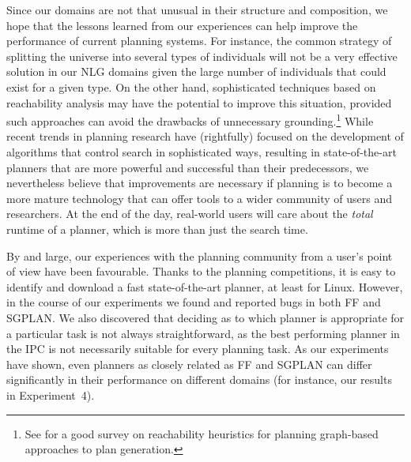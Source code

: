 Since our domains are not that unusual in their structure and composition,
we hope that the lessons learned from our experiences can help improve the
performance of current planning systems. For instance, the common strategy
of splitting the universe into several types of individuals will not be a
very effective solution in our NLG domains given the large number of
individuals that could exist for a given type. On the other hand,
sophisticated techniques based on reachability analysis may have the
potential to improve this situation, provided such approaches can avoid the
drawbacks of unnecessary grounding.\footnote{See
  \citep{Bryce:07} for a good survey on reachability heuristics for planning
  graph-based approaches to plan generation.}
While recent trends in planning research have (rightfully) focused on the
development of algorithms that control search in sophisticated ways,
resulting in state-of-the-art planners that are more powerful and
successful than their predecessors, we nevertheless believe that
improvements are necessary if planning is to become a more mature
technology that can offer tools to a wider community of users and
researchers. At the end of the day, real-world users will care about the
\emph{total} runtime of a planner, which is more than just the search time.

By and large, our experiences with the planning community from a user's
point of view have been favourable. Thanks to the planning competitions, it
is easy to identify and download a fast state-of-the-art planner, at least
for Linux. However, in the course of our experiments we found and reported
bugs in both FF and SGPLAN. We also discovered that deciding as to which
planner is appropriate for a particular task is not always straightforward,
as the best performing planner in the IPC is not necessarily suitable for
every planning task. As our experiments have shown, even planners as
closely related as FF and SGPLAN can differ significantly in their
performance on different domains (for instance, our results in
Experiment~4).



